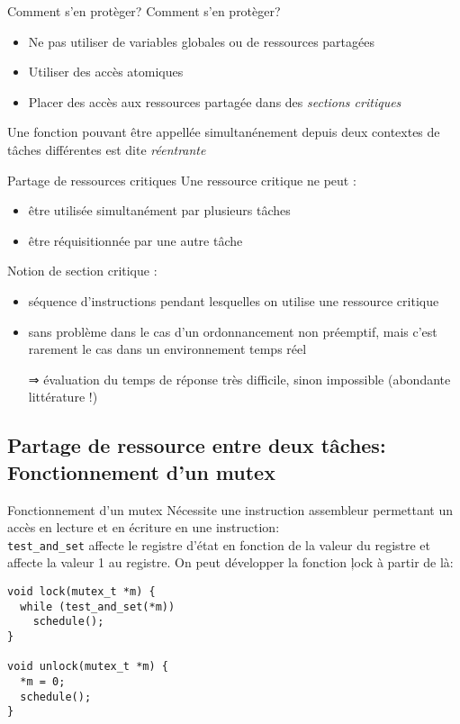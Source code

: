 \begin{frame}{Comment s'en protèger?}
  Comment s'en protèger?
  \begin{itemize}
  \item  Ne  pas  utiliser  de  variables globales  ou  de  ressources
    partagées
  \item Utiliser des accès atomiques
  \item   Placer  des   accès   aux  ressources   partagée  dans   des
    \emph{sections critiques}
  \end{itemize}
  Une  fonction  pouvant  être  appellée simultanénement  depuis  deux
  contextes de tâches différentes est dite \emph{réentrante}
\end{frame}

\begin{frame}{Partage de ressources critiques}
  Une ressource critique ne peut :
  \begin{itemize}
  \item être utilisée simultanément par plusieurs tâches
  \item être réquisitionnée par une autre tâche
  \end{itemize}
  Notion de section critique :
  \begin{itemize}
  \item  séquence  d'instructions pendant  lesquelles  on utilise  une
    ressource critique
  \item sans  problème dans le cas d'un  ordonnancement non préemptif,
    mais  c'est rarement  le cas  dans un  environnement temps  réel
  \item[⇒]  évaluation  du  temps  de réponse  très  difficile,  sinon
    impossible (abondante littérature !)
  \end{itemize}
\end{frame}

\subsection{Partage de ressource entre deux tâches: Fonctionnement d'un mutex}

\begin{frame}[fragile]{Fonctionnement d'un mutex}
  Nécessite une instruction assembleur  permettant un accès en lecture
  et en écriture  en une instruction: \\
  \texttt{test\_and\_set} affecte le registre d'état en fonction de la
  valeur  du registre  et affecte  la valeur  1 au  registre.  On peut
  développer la fonction \c{lock} à partir de là:
  \begin{lstlisting}
void lock(mutex_t *m) {
  while (test_and_set(*m))
    schedule();
}

void unlock(mutex_t *m) {
  *m = 0;
  schedule();
}
  \end{lstlisting}
\end{frame}


